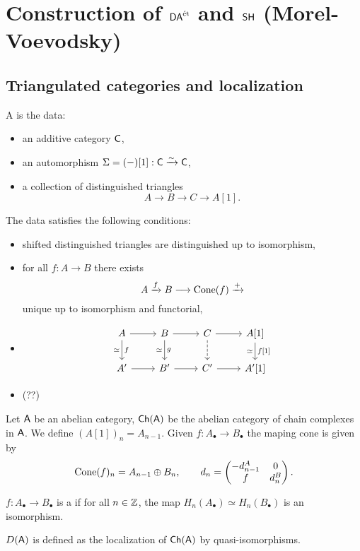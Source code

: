 \section{Construction of \texorpdfstring{$\mathsf{DA}^{\text{\'et}}$}{DA\'et} and \texorpdfstring{$\mathsf{SH}$}{SH} (Morel-Voevodsky)}
\subsection{Triangulated categories and localization}
\begin{definition}
	A  is the data:
	\begin{itemize}
		\item an additive category $\mathsf{C}$,
		\item an automorphism $\Sigma=(-)[1]:\mathsf{C}\xrightarrow{\sim} \mathsf{C}$,
		\item a collection of distinguished triangles
			\[
				A \to B \to C \to A[1]
			.\] 
	\end{itemize}
	The data satisfies the following conditions:
	\begin{itemize}
		\item shifted distinguished triangles are distinguished up to isomorphism,
		\item for all $f:A\to B$ there exists
			\[
				A \xrightarrow{f} B \to \Cone(f) \xrightarrow{+}
			\] 
			unique up to isomorphism and functorial,
		\item 
			\begin{equation*}
			\begin{tikzcd}
				A \ar[r] \ar[d,"f","\simeq"'] & B \ar[r] \ar[d,"g","\simeq"'] & C \ar[d,dashed] \ar[r] & A[1] \ar[d,"{f[1]}","\simeq"'] \\
				A' \ar[r] & B' \ar[r] & C' \ar[r] & A'[1]
			\end{tikzcd}
			\end{equation*}	
		\item (??)
	\end{itemize}
\end{definition}

\begin{example}
	Let $\mathsf{A}$ be an abelian category, $\mathsf{Ch}(\mathsf{A})$ be the abelian category of chain complexes in $\mathsf{A}$. We define $(A[1])_n = A_{n-1}$. Given $f:A_\bullet\to B_\bullet$ the maping cone is given by
	\[
		\operatorname{Cone}(f)_n = A_{n-1} \oplus B_n,\qquad d_n = \begin{pmatrix} -d_{n-1}^{A} & 0 \\ f & d_n^{B} \end{pmatrix} 
	.\] 
\end{example}
\begin{definition}
	$f:A_\bullet\to B_\bullet$ is a  if for all $n\in \mathbb Z$, the map $H_n(A_\bullet)\simeq H_n(B_\bullet)$ is an isomorphism.
\end{definition}
\begin{definition}
	$D(\mathsf{A})$ is defined as the localization of $\mathsf{Ch}(\mathsf{A})$ by quasi-isomorphisms.
\end{definition}

